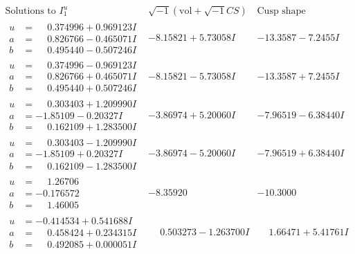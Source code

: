 \documentclass[1p]{elsarticle_modified}
\theoremstyle{definition}
\newcommand{\I}{\sqrt{-1}}
\begin{document}
$$\begin{array}{c|c|c}  
\text{Solutions to }I^u_{1}& \I (\text{vol} + \sqrt{-1}CS) & \text{Cusp shape}\\
 \hline 
\begin{aligned}
u &= \phantom{-}0.374996 + 0.969123 I \\
a &= \phantom{-}0.826766 - 0.465071 I \\
b &= \phantom{-}0.495440 - 0.507246 I\end{aligned}
 & -8.15821 + 5.73058 I & -13.3587 - 7.2455 I \\ \hline\begin{aligned}
u &= \phantom{-}0.374996 - 0.969123 I \\
a &= \phantom{-}0.826766 + 0.465071 I \\
b &= \phantom{-}0.495440 + 0.507246 I\end{aligned}
 & -8.15821 - 5.73058 I & -13.3587 + 7.2455 I \\ \hline\begin{aligned}
u &= \phantom{-}0.303403 + 1.209990 I \\
a &= -1.85109 - 0.20327 I \\
b &= \phantom{-}0.162109 + 1.283500 I\end{aligned}
 & -3.86974 + 5.20060 I & -7.96519 - 6.38440 I \\ \hline\begin{aligned}
u &= \phantom{-}0.303403 - 1.209990 I \\
a &= -1.85109 + 0.20327 I \\
b &= \phantom{-}0.162109 - 1.283500 I\end{aligned}
 & -3.86974 - 5.20060 I & -7.96519 + 6.38440 I \\ \hline\begin{aligned}
u &= \phantom{-}1.26706\phantom{ +0.000000I} \\
a &= -0.176572\phantom{ +0.000000I} \\
b &= \phantom{-}1.46005\phantom{ +0.000000I}\end{aligned}
 & -8.35920\phantom{ +0.000000I} & -10.3000\phantom{ +0.000000I} \\ \hline\begin{aligned}
u &= -0.414534 + 0.541688 I \\
a &= \phantom{-}0.458424 + 0.234315 I \\
b &= \phantom{-}0.492085 + 0.000051 I\end{aligned}
 & \phantom{-}0.503273 - 1.263700 I & \phantom{-}1.66471 + 5.41761 I \\ \hline\begin{aligned}

\end{aligned}
\end{array}$$
\end{document}
